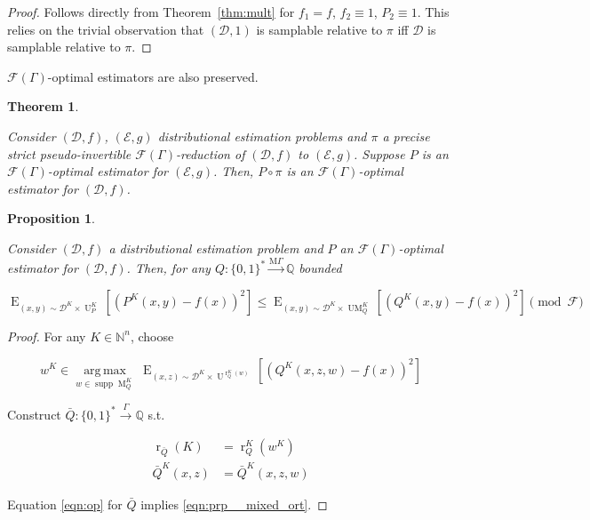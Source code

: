 \documentclass[11pt]{article}
\numberwithin{equation}{section}
\theoremstyle{definition}
\theoremstyle{plain}
\newtheorem{theorem}{Theorem}[section]
\newtheorem{proposition}{Proposition}[section]
\newcommand{\Bool}{\{0,1\}}
\newcommand{\Words}{{\Bool^*}}
\DeclareMathOperator{\Supp}{supp}
\DeclareMathOperator{\E}{E}
\DeclareMathOperator{\R}{r}
\DeclareMathOperator{\M}{M}
\DeclareMathOperator{\UM}{UM}
\DeclareMathOperator{\Un}{U}
\newcommand{\Argmax}[1]{\underset{#1}{\operatorname{arg\,max}}\,}
\newcommand{\Nats}{\mathbb{N}}
\newcommand{\Rats}{\mathbb{Q}}
\newcommand{\Dist}{\mathcal{D}}
\newcommand{\MGrow}{\mathrm{M}\Gamma}
\newcommand{\Fall}{\mathcal{F}}
\newcommand{\EG}{\Fall(\Gamma)}
\newcommand{\Scheme}{\xrightarrow{\Gamma}}
\newcommand{\MScheme}{\xrightarrow{\MGrow}}
\begin{document}
\begin{proof}

Follows directly from Theorem~\ref{thm:mult} for $f_1 = f$, ${f_2 \equiv 1}$, $P_2 \equiv 1$. This relies on the trivial observation that $(\Dist, 1)$ is samplable relative to $\pi$ iff $\Dist$ is samplable relative to $\pi$.
%
\end{proof}

$\EG$-optimal estimators are also preserved.

\begin{samepage}
\begin{theorem}
\label{thm:psp_reduce}

Consider $(\Dist,f)$, $(\mathcal{E},g)$ distributional estimation problems and $\pi$ a precise strict pseudo-invertible $\EG$-reduction of $(\Dist, f)$ to $(\mathcal{E}, g)$. Suppose $P$ is an $\EG$-optimal estimator for $(\mathcal{E}, g)$. Then, $P \circ \pi$ is an $\EG$-optimal estimator for $(\Dist, f)$.

\end{theorem}
\end{samepage}

\begin{samepage}
\begin{proposition}
\label{prp:mixed_opt}

Consider ${(\Dist,f)}$ a distributional estimation problem and ${P}$ an ${\EG}$-optimal estimator for ${(\Dist,f)}$. Then, for any $Q: \Words \MScheme \Rats$ bounded

\begin{equation}
\label{eqn:prp__mixed_ort}
\E_{(x,y) \sim \Dist^{K} \times \Un_P^K}[(P^K(x,y) - f(x))^2] \leq \E_{(x,y) \sim \Dist^{K} \times \UM_Q^K}[(Q^K(x,y)-f(x))^2] \pmod \Fall
\end{equation}

\end{proposition}
\end{samepage}

\begin{proof}

For any ${K \in \Nats^n}$, choose 

\[w^K \in \Argmax{w \in \Supp \M_Q^K} \E_{(x,z) \sim \Dist^{K} \times \Un^{\R_Q^K(w)}}[(Q^K(x,z,w)-f(x))^2]\]

Construct ${\bar{Q}: \Words \Scheme \Rats}$ s.t.

\begin{align*}
\R_{\bar{Q}}(K) &= \R_Q^K(w^K) \\
\bar{Q}^K(x,z) &= \bar{Q}^K(x,z,w)
\end{align*}

Equation \ref{eqn:op} for ${\bar{Q}}$ implies \ref{eqn:prp__mixed_ort}.
%
\end{proof}
\end{document}

